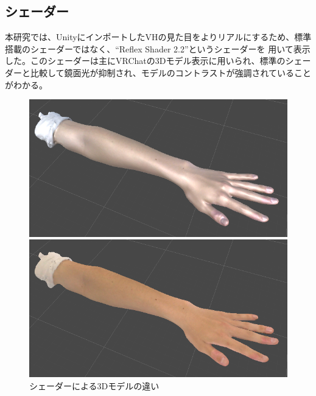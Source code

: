 \documentclass{ltjsreport}
\begin{document}
		\subsection{シェーダー}
			本研究では、UnityにインポートしたVHの見た目をよりリアルにするため、標準搭載のシェーダーではなく、``Reflex Shader 2.2''というシェーダーを
			用いて表示した。このシェーダーは主にVRChatの3Dモデル表示に用いられ、標準のシェーダーと比較して鏡面光が抑制され、モデルのコントラストが強調されていることがわかる。
			\begin{figure}[H]
			\centering
			\begin{minipage}{0.4\columnwidth}
			\centering
			\includegraphics[width = \columnwidth]{../figs/NomalShader.png}
			\end{minipage}
			\hspace{0.04\columnwidth}
			\begin{minipage}{0.4\columnwidth}
			\centering
			\includegraphics[width = \columnwidth]{../figs/ReflexShader.png}
			\end{minipage}
			\caption{シェーダーによる3Dモデルの違い}
			\label{fig:Shader}
			\end{figure}
\end{document}
